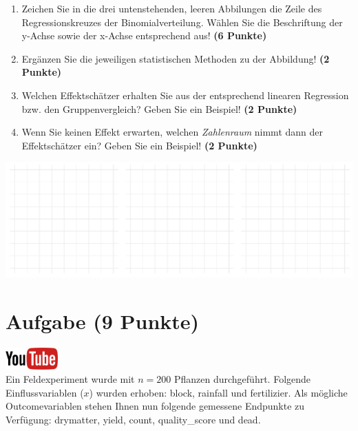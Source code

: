 \documentclass[a4paper, 9pt]{scrartcl}\usepackage[]{graphicx}\usepackage[]{xcolor}
\makeatletter
\def\maxwidth{ %
  \ifdim\Gin@nat@width>\linewidth
    \linewidth
  \else
    \Gin@nat@width
  \fi
}
\makeatother
\begin{document}
\begin{enumerate}
\item Zeichen Sie in die drei untenstehenden, leeren Abbilungen die Zeile des
  Regressionskreuzes der Binomialverteilung. W{\"a}hlen Sie die Beschriftung der
  y-Achse sowie der x-Achse entsprechend aus! \textbf{(6 Punkte)}
\item Erg{\"a}nzen Sie die jeweiligen statistischen Methoden zu der Abbildung! \textbf{(2 Punkte)}
\item Welchen Effektsch{\"a}tzer erhalten Sie aus der entsprechend linearen
  Regression bzw. den Gruppenvergleich? Geben Sie ein Beispiel! \textbf{(2 Punkte)}
\item Wenn Sie keinen Effekt erwarten, welchen \textit{Zahlenraum} nimmt dann
  der Effektsch{\"a}tzer ein? Geben Sie ein Beispiel! \textbf{(2 Punkte)}
\end{enumerate}



{\centering \includegraphics[width=\maxwidth]{img/regression-01-1} 

}



 
\clearpage

\section{Aufgabe \hfill (9 Punkte)}

\hfill\href{https://youtu.be/AwQEcQWLFCw}{\includegraphics[width =
  2cm]{img/youtube}}\\[1Ex]



Ein Feldexperiment wurde mit $n = 200$ Pflanzen durchgef{\"u}hrt. Folgende
Einflussvariablen ($x$) wurden erhoben: block, rainfall und fertilizier. Als m{\"o}gliche Outcomevariablen stehen Ihnen nun
folgende gemessene Endpunkte zu Verf{\"u}gung: drymatter, yield, count, quality\_score und dead.
\end{document}
